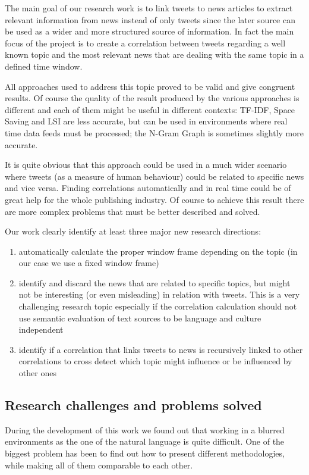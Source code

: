 The main goal of our research work is to link tweets to news articles to extract relevant information from news 
instead of only tweets since the later source can be used as a wider and more structured source of information. 
In fact the main focus of the project is to create a correlation between tweets
regarding a well known topic and 
the most relevant news that are dealing with the same topic in a defined time window.
 
All approaches used to address this topic proved to be valid and give congruent results. 
Of course the quality of the result produced by the various approaches is different and each of them
might be useful in different contexts: TF-IDF, Space Saving and LSI  are less accurate, but can be used in environments where 
real time data feeds must be processed; the N-Gram Graph is sometimes  slightly
more accurate.


It is quite obvious that this approach could be used in a much wider scenario where tweets (as a measure of 
human behaviour) could be related to specific news and vice versa. Finding correlations automatically and 
in real time could be of great help for the whole publishing industry. Of course to achieve this result there 
are more complex problems that must be better described and solved.

Our work clearly identify at least three major new research directions:
\begin{enumerate}
	\item automatically calculate the proper window frame depending on the topic (in our case we use a fixed window frame)
	\item identify and discard the news that are related to specific topics, but might not be interesting (or even misleading) in relation with tweets. This is a very challenging research topic especially if the correlation calculation should not use semantic evaluation of text sources to be language and culture  independent 
	\item identify if a correlation that links tweets to news is recursively linked to other correlations to cross detect which topic might influence or be influenced by other ones
\end{enumerate}

\subsection*{Research challenges and problems solved}
During the development of this work we found out that working in a blurred
environments as the one of the natural language is quite difficult. One of the
biggest problem has been to find out how to present different methodologies,
while making all of them comparable to each other.

